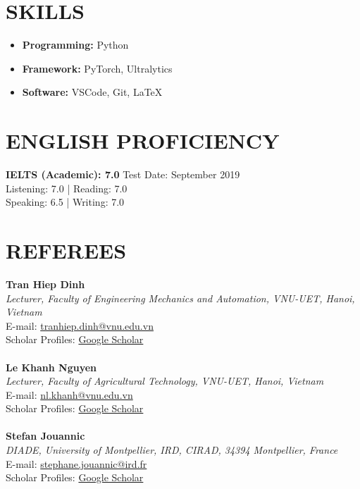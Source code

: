 \documentclass[a4paper,9pt]{extarticle}
\begin{document}
\section*{SKILLS}
\begin{itemize}
    \item \textbf{Programming:} Python
    \item \textbf{Framework:} PyTorch, Ultralytics
    \item \textbf{Software:} VSCode, Git, LaTeX
\end{itemize}

\section*{ENGLISH PROFICIENCY}
\noindent\textbf{IELTS (Academic): 7.0} \hfill Test Date: September 2019\\ 
Listening: 7.0 | Reading: 7.0 \\
Speaking: 6.5 | Writing: 7.0 

\section*{REFEREES}
\label{sec:referees}
\textbf{Tran Hiep Dinh}\\
\textit{Lecturer, Faculty of Engineering Mechanics and Automation, VNU-UET, Hanoi, Vietnam}\\
E-mail: \href{mailto:tranhiep.dinh@vnu.edu.vn}{tranhiep.dinh@vnu.edu.vn}\\
Scholar Profiles: \href{https://scholar.google.com/citations?user=fJYX_zsAAAAJ&hl=en&oi=ao}{Google Scholar} \\ \\
\textbf{Le Khanh Nguyen}\\
\textit{Lecturer, Faculty of Agricultural Technology, VNU-UET, Hanoi, Vietnam}\\
E-mail: \href{mailto:nl.khanh@vnu.edu.vn}{nl.khanh@vnu.edu.vn}\\
Scholar Profiles: \href{https://scholar.google.com/citations?user=E-1iGYIAAAAJ&hl=en&oi=ao}{Google Scholar} \\ \\
\textbf{Stefan Jouannic}\\
\textit{DIADE, University of Montpellier, IRD, CIRAD, 34394 Montpellier, France}\\
E-mail: \href{mailto:stephane.jouannic@ird.fr}{stephane.jouannic@ird.fr}\\
Scholar Profiles: \href{https://scholar.google.com/citations?user=y5kP-ZAAAAAJ&hl=vi}{Google Scholar} \\ \\

\end{document}
